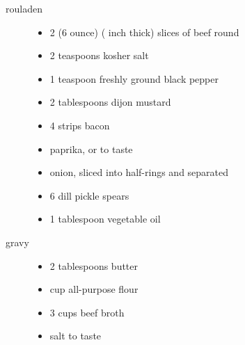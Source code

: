 \begin{description}
\item[rouladen] \hfill
  \begin{itemize}
    \item 2 (6 ounce) ( inch thick) slices of beef round
    \item 2 teaspoons kosher salt
    \item 1 teaspoon freshly ground black pepper
    \item 2 tablespoons dijon mustard
    \item 4 strips bacon
    \item paprika, or to taste
    \item {} onion, sliced into half-rings and separated
    \item 6 dill pickle spears
    \item 1 tablespoon vegetable oil
  \end{itemize}
\item [gravy] \hfill
  \begin{itemize}
  \item 2 tablespoons butter
  \item {} cup all-purpose flour
  \item 3 cups beef broth
  \item salt to taste
  \end{itemize}
\end{description}

